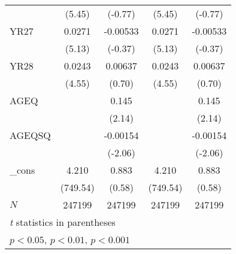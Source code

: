 {\begin{tabular}{l*{4}{c}}
            &      (5.45)         &     (-0.77)         &      (5.45)         &     (-0.77)         \\
[1em]
YR27        &      0.0271\sym{***}&    -0.00533         &      0.0271\sym{***}&    -0.00533         \\
            &      (5.13)         &     (-0.37)         &      (5.13)         &     (-0.37)         \\
[1em]
YR28        &      0.0243\sym{***}&     0.00637         &      0.0243\sym{***}&     0.00637         \\
            &      (4.55)         &      (0.70)         &      (4.55)         &      (0.70)         \\
[1em]
AGEQ        &                     &       0.145\sym{*}  &                     &       0.145\sym{*}  \\
            &                     &      (2.14)         &                     &      (2.14)         \\
[1em]
AGEQSQ      &                     &    -0.00154\sym{*}  &                     &    -0.00154\sym{*}  \\
            &                     &     (-2.06)         &                     &     (-2.06)         \\
[1em]
\_cons      &       4.210\sym{***}&       0.883         &       4.210\sym{***}&       0.883         \\
            &    (749.54)         &      (0.58)         &    (749.54)         &      (0.58)         \\
\hline
\(N\)       &      247199         &      247199         &      247199         &      247199         \\
\hline\hline
\multicolumn{5}{l}{\footnotesize \textit{t} statistics in parentheses}\\
\multicolumn{5}{l}{\footnotesize \sym{*} \(p<0.05\), \sym{**} \(p<0.01\), \sym{***} \(p<0.001\)}\\
\end{tabular}
}
